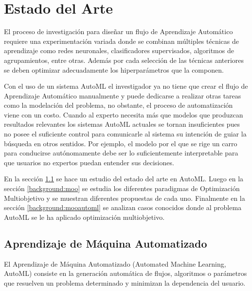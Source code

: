 \chapter{Estado del Arte}\label{chapter:state-of-the-art}
El proceso de investigaci\'on para dise\~nar un flujo de Aprendizaje Autom\'atico requiere una experimentaci\'on variada donde se combinan m\'ultiples t\'ecnicas de aprendizaje como redes neuronales, clasificadores supervisados, algoritmos de agrupamientos, entre otras. Adem\'as por cada selecci\'on de las t\'ecnicas anteriores se deben optimizar adecuadamente los hiperpar\'ametros que la componen.

Con el uso de un sistema AutoML el investigador ya no tiene que crear el flujo de Aprendizaje Autom\'atico manualmente y puede dedicarse a realizar otras tareas como la modelaci\'on del problema, no obstante, el proceso de automatizaci\'on viene con un costo. Cuando al experto necesita m\'as que modelos que produzcan resultados relevantes los sistemas AutoML actuales se tornan insuficientes pues no posee el suficiente control para comunicarle al sistema su intenci\'on de guiar la b\'usqueda en otros sentidos. Por ejemplo, el modelo por el que se rige un carro para conducirse aut\'onomamente debe ser lo suficientemente interpretable para que usuarios no expertos puedan entender sus decisiones.

En la secci\'on \ref{background:automl} se  hace un estudio del estado del arte en AutoML. Luego en la secci\'on \ref{background:moo} se estudia los diferentes paradigmas de Optimizaci\'on Multiobjetivo y se muestran diferentes propuestas de cada uno. Finalmente en la secci\'on \ref{background:mooautoml} se analizan casos conocidos donde al problema AutoML se le ha aplicado optimizaci\'on multiobjetivo.

\section{Aprendizaje de M\'aquina Automatizado}\label{background:automl}
El Aprendizaje de M\'aquina Automatizado (Automated Machine Learning, AutoML) consiste en la generaci\'on autom\'atica de flujos, algoritmos o par\'ametros que resuelven un problema determinado y minimizan la dependencia del usuario. 

